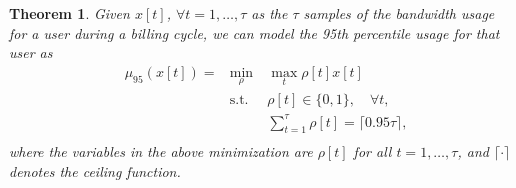 \documentclass[10pt,journal,compsoc]{IEEEtran}
\newtheorem{theorem}{Theorem}
\begin{document}
\begin{theorem} \label{theorem1}
Given $x[t]$, $\forall t=1,\ldots, \tau$  as the $\tau$ samples of the bandwidth usage for a user during a billing cycle, we can model the \emph{95th percentile usage} for that user as
\begin{equation}
\label{mu_95_Model}
\begin{aligned}
& \mu_{95}(x[t]) = \!\!\! & \min_\rho \ & \max_t  \rho[t]  x[t]\\
& & \text{s.t.} \ \ & \rho[t] \in \{0,1\}, \quad \forall t, \\
& & & \! \sum_{t=1}^{\tau} {\rho[t]}=\lceil0.95 \tau\rceil,\\
\end{aligned}
\end{equation}
where the variables in the above minimization are $\rho[t]$ for all $t = 1,\ldots, \tau$, and $\lceil \cdot \rceil$ denotes the ceiling function. \end{theorem}
\end{document}

